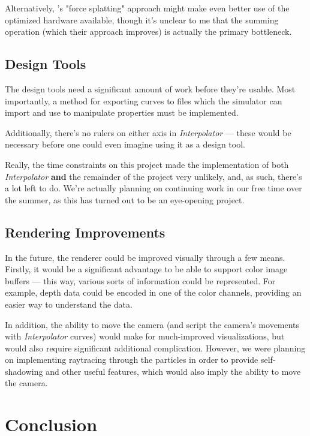 \documentclass{acmsiggraph}
\begin{document}
Alternatively, \cite{1281670}'s "force splatting" approach might make even better use of the optimized hardware available, though it's unclear to me that the summing operation (which their approach improves) is actually the primary bottleneck.

\subsection{Design Tools}

The design tools need a significant amount of work before they're usable. Most importantly, a method for exporting curves to files which the simulator can import and use to manipulate properties must be implemented.

Additionally, there's no rulers on either axis in {\it Interpolator} --- these would be necessary before one could even imagine using it as a design tool.

Really, the time constraints on this project made the implementation of both {\it Interpolator} {\bf and} the remainder of the project very unlikely, and, as such, there's a lot left to do. We're actually planning on continuing work in our free time over the summer, as this has turned out to be an eye-opening project.

\subsection{Rendering Improvements}

In the future, the renderer could be improved visually through a few means. Firstly, it would be a significant advantage to be able to support color image buffers --- this way, various sorts of information could be represented. For example, depth data could be encoded in one of the color channels, providing an easier way to understand the data.

In addition, the ability to move the camera (and script the camera's movements with {\it Interpolator} curves) would make for much-improved visualizations, but would also require significant additional complication. However, we were planning on implementing raytracing through the particles in order to provide self-shadowing and other useful features, which would also imply the ability to move the camera.

\section{Conclusion}
\end{document}
